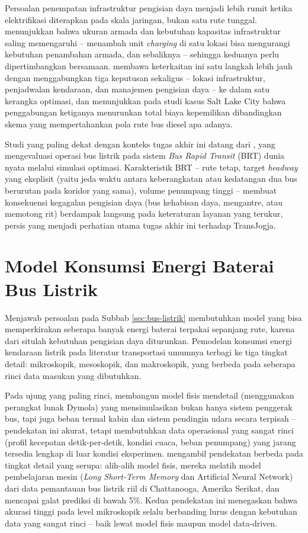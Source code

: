 Persoalan penempatan infrastruktur pengisian daya menjadi lebih rumit ketika
elektrifikasi diterapkan pada skala jaringan, bukan satu rute tunggal.
\textcite{rogge2018} menunjukkan bahwa ukuran armada dan
kebutuhan kapasitas infrastruktur saling memengaruhi -- menambah unit
\textit{charging} di satu lokasi bisa mengurangi kebutuhan penambahan
armada, dan sebaliknya -- sehingga keduanya perlu dipertimbangkan bersamaan.
\textcite{he2023} membawa keterkaitan ini satu langkah
lebih jauh dengan menggabungkan tiga keputusan sekaligus -- lokasi
infrastruktur, penjadwalan kendaraan, dan manajemen pengisian daya -- ke
dalam satu kerangka optimasi, dan menunjukkan pada studi kasus Salt Lake
City bahwa penggabungan ketiganya menurunkan total biaya kepemilikan
dibandingkan skema yang mempertahankan pola rute bus diesel apa adanya.

Studi yang paling dekat dengan konteks tugas akhir ini datang dari
\textcite{sebastiani2016}, yang mengevaluasi
operasi bus listrik pada sistem \textit{Bus Rapid Transit} (BRT) dunia nyata
melalui simulasi optimasi. Karakteristik BRT -- rute tetap, target
\textit{headway} yang eksplisit (yaitu jeda waktu antara keberangkatan
atau kedatangan dua bus berurutan pada koridor yang sama), volume
penumpang tinggi -- membuat konsekuensi kegagalan
pengisian daya (bus kehabisan daya, mengantre, atau memotong rit) berdampak
langsung pada keteraturan layanan yang terukur, persis yang menjadi
perhatian utama tugas akhir ini terhadap TransJogja.

\section{Model Konsumsi Energi Baterai Bus Listrik}
\label{sec:baterai-bus-listrik}

Menjawab persoalan pada Subbab \ref{sec:bus-listrik} membutuhkan model yang
bisa memperkirakan seberapa banyak energi baterai terpakai sepanjang rute,
karena dari situlah kebutuhan pengisian daya diturunkan. Pemodelan konsumsi
energi kendaraan listrik pada literatur transportasi umumnya terbagi ke
tiga tingkat detail: mikroskopik, mesoskopik, dan makroskopik, yang berbeda
pada seberapa rinci data masukan yang dibutuhkan.

Pada ujung yang paling rinci, \textcite{basma2020} membangun
model fisis mendetail (menggunakan perangkat lunak Dymola) yang
mensimulasikan bukan hanya sistem penggerak bus, tapi juga beban termal
kabin dan sistem pendingin udara secara terpisah -- pendekatan ini akurat,
tetapi membutuhkan data operasional yang sangat rinci (profil kecepatan
detik-per-detik, kondisi cuaca, beban penumpang) yang jarang tersedia
lengkap di luar kondisi eksperimen. \textcite{chen2021} mengambil pendekatan berbeda pada tingkat detail yang
serupa: alih-alih model fisis, mereka melatih model pembelajaran mesin
(\textit{Long Short-Term Memory} dan Artificial Neural Network) dari data
pemantauan bus listrik riil di Chattanooga, Amerika Serikat, dan mencapai
galat prediksi di bawah 5\%. Kedua pendekatan ini menegaskan bahwa
akurasi tinggi pada level mikroskopik selalu berbanding lurus dengan
kebutuhan data yang sangat rinci -- baik lewat model fisis maupun model
data-driven.

